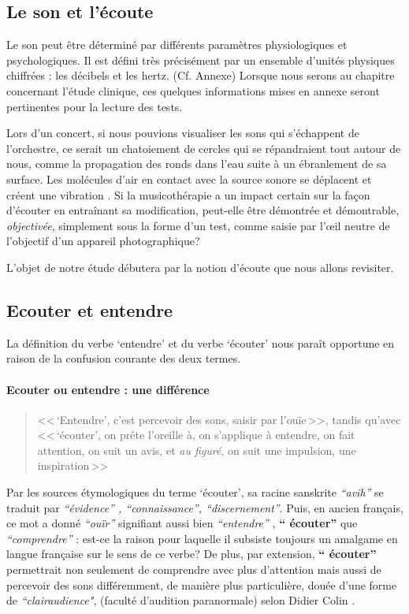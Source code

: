 
\subsection{Le son et l'écoute}


Le son peut être déterminé par différents paramètres
physiologiques et psychologiques.
Il est défini très précisément par un ensemble d'unités physiques chiffrées
: les décibels  et les hertz. (Cf. Annexe)
Lorsque nous serons au chapitre concernant l'étude clinique,
ces quelques informations mises en annexe seront pertinentes pour la lecture des tests.

Lors d'un concert, si nous pouvions visualiser les sons qui
s'échappent de l'orchestre, ce serait un chatoiement de cercles qui se
répandraient tout autour de nous, comme
la propagation des
ronds dans l'eau suite à un ébranlement de sa surface.
Les molécules d'air en contact avec la source sonore se déplacent et
créent une vibration \autocite[183]{bencivelli:pourquoi,}.
Si la
musicothérapie a un impact certain sur la façon d'écouter en
entraînant sa
modification, peut-elle être  démontrée et démontrable, \textsl{objectivée},
simplement sous la forme d'un test, comme saisie par
l'\oe il neutre de l'objectif d'un appareil
photographique?

L'objet de notre étude débutera par la notion d'écoute que nous allons revisiter.
\subsection{Ecouter et entendre}
La définition du verbe `entendre' et du verbe `écouter'
nous paraît opportune
en raison de la confusion courante des deux termes.
\paragraph{Ecouter ou entendre : une différence}
\begin{quote}<<\,`Entendre', c'est  percevoir des sons, saisir par l'ouïe\,>>, tandis qu'avec
<<\,`écouter', on prête l'oreille à, on s'applique à entendre, on fait attention, on suit un avis, et \emph{au figuré}, on suit une impulsion, une inspiration\,>> \autocite[361--385]{hachette:dictionnaire} \end{quote}
Par les sources étymologiques du
terme `écouter',
 sa racine sanskrite \emph{ ``avih'' } se traduit par
 \emph{``évidence'' , ``connaissance'', ``discernement''}. Puis, en ancien
 français, ce mot a donné \textit{``ouïr''} signifiant aussi bien \textit{``entendre''} ,
\textbf{`` écouter'' } que \textit{``comprendre''} \autocite {etymologieWeb}:
 est-ce la raison
pour laquelle il subsiste toujours un amalgame en langue française
sur le sens de ce verbe?
De plus, par extension, \textbf{`` écouter'' }
permettrait non seulement de comprendre avec plus d'attention
mais aussi de percevoir des sons différemment, de manière plus particulière, douée d'une forme de
\textit{``clairaudience"}, (faculté d'audition paranormale) selon Didier
Colin \autocite {colin2015}.

